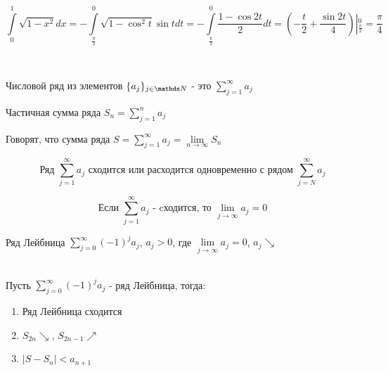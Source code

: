 \documentclass[12pt, fleqn]{article}
\begin{document}
\begin{Property}[3]
\begin{Property}[4]
\begin{Property}[2, аддитивность]
\begin{Example}
    \[\int\limits_0^1 \sqrt{1-x^2} dx = - \int\limits_{\frac{\pi}{2}}^0 \sqrt{1-\cos^2 t} \sin t dt = - \int\limits_{\frac{\pi}{2}}^0 \frac{1 - \cos 2t}{2} dt = (-\frac{t}{2} + \frac{\sin 2t}{4}) \left|_{\frac{\pi}{2}}^0 = \frac{\pi}{4}\]
\end{Example}

\newpage
\begin{Reminder} \
\begin{definition}
    Числовой ряд из элементов $\{a_j\}_{j \in \N}$ - это $\sum\limits_{j=1}^\infty a_j$
\end{definition}

\begin{definition}
    Частичная сумма ряда $S_n = \sum\limits_{j=1}^n a_j$
\end{definition}

\begin{definition}
    Говорят, что сумма ряда $S=\sum\limits_{j=1}^\infty a_j=\lim\limits_{n \rightarrow \infty} S_n$
\end{definition}

\begin{Remark}
    \[\text{Ряд $\sum\limits_{j=1}^\infty a_j$ сходится или расходится одновременно с рядом $\sum\limits_{j=N}^\infty a_j$}\]
\end{Remark}

\begin{Theorem} 
    \[\text{Если $\sum\limits_{j=1}^\infty a_j$ - cходится, то $\lim\limits_{j \rightarrow \infty} a_j = 0$}\]
\end{Theorem}

\begin{definition}
    Ряд Лейбница $\sum\limits_{j=0}^\infty (-1)^j a_j$, $a_j>0$, где $\lim\limits_{j \rightarrow \infty} a_j =0$, $a_j \searrow$
\end{definition}

\begin{theorem}\ \\
    Пусть $\sum\limits_{j=0}^\infty (-1)^j a_j$ - ряд Лейбница, тогда:
    \begin{enumerate}
        \item Ряд Лейбница сходится
        \item $S_{2n} \searrow$, $S_{2n-1} \nearrow$
        \item $|S-S_n|<a_{n+1}$
    \end{enumerate}
\end{theorem}


\end{Reminder}
\end{Property}
\end{Property}
\end{Property}
\end{document}
